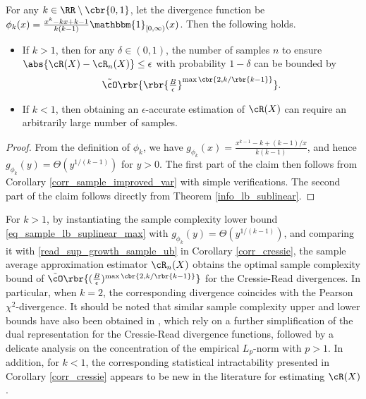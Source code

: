 \documentclass[9pt]{article} %
\numberwithin{equation}{section}
\renewcommand{\frac}[2]{\tfrac{#1}{#2}}
\begin{document}
\begin{corollary}\label{corr_cressie}
For any $k \in \RR \setminus \cbr{0, 1}$,  let the divergence function be $\phi_k (x) = \frac{x^k - kx + k-1}{k(k-1)} \mathbbm{1}_{[0, \infty)}(x)$. 
Then the following holds.
\begin{itemize}
\item[(1)]  If $k > 1$, then for any $\delta \in (0,1)$, the number of samples $n$ to ensure $\abs{\cR(X) - \cR_n(X)} \leq \epsilon$ with probability $1-\delta$ can be bounded by 
\begin{align}\label{read_sup_growth_sample_ub}
\tilde{\cO} \rbr{
\rbr{\frac{B}{\epsilon}}^{ \max \cbr{2, {k}/\rbr{k-1}} }
}.
\end{align}
\item [(2)] If $k < 1$, then obtaining an $\epsilon$-accurate estimation of $\cR(X)$ can require an arbitrarily large number of samples.
\end{itemize}
\end{corollary}

\begin{proof}
From the definition of $\phi_k$, we have $g_{\phi_k}(x) = \frac{x^{k-1} - k + (k-1)/x}{k(k-1)}$, and hence 
$g_{\phi_k}(y) = \Theta (y^{1/(k-1)})$ for $y > 0$. 
The first part of the claim then follows from Corollary \ref{corr_sample_improved_var} with simple verifications. 
The second part of the claim follows  directly from Theorem \ref{info_lb_sublinear}.
\end{proof}

For $k > 1$, by instantiating the sample complexity lower bound \eqref{eq_sample_lb_suplinear_max} with $g_{\phi_k}(y) = \Theta (y^{1/(k-1)})$,
and comparing it with \eqref{read_sup_growth_sample_ub} in Corollary \ref{corr_cressie}, the sample average approximation estimator $\cR_n(X)$ obtains the optimal sample complexity bound of 
$\tilde{\cO} \rbr{
(\frac{B}{\epsilon})^{ \max \cbr{2, {k}/\rbr{k-1}} }
}$
for the Cressie-Read divergences.
In particular, when $k=2$, the corresponding divergence coincides with the Pearson $\chi^2$-divergence.
It should be noted that similar sample complexity upper and lower bounds have also been obtained in \cite{duchi2021learning}, which rely on a further simplification of the dual representation for the  Cressie-Read divergence functions, followed by a delicate analysis on the concentration of the empirical $L_p$-norm with $p > 1$.
In addition, for $k < 1$, the corresponding statistical intractability presented in Corollary \ref{corr_cressie} appears to be new in the literature for estimating $\cR(X)$. 
\end{document}
